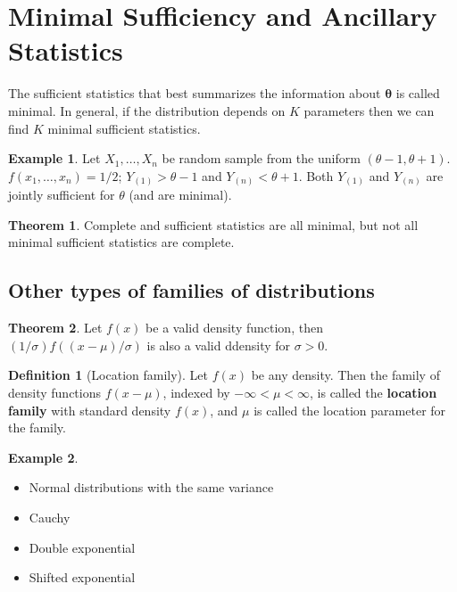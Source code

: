 \documentclass{book}
\theoremstyle{definition}
\newtheorem{defn}{Definition}[section]
\newtheorem{thm}{Theorem}[section]
\newtheorem{exmp}{Example}[section]
\begin{document}
\section{Minimal Sufficiency and Ancillary Statistics}

The sufficient statistics that best summarizes the information about $\bm\theta$ is called minimal. In general, if the distribution depends on $K$ parameters then we can find $K$ minimal sufficient statistics. 


\begin{exmp}
	Let $X_1,\dots, X_n$ be random sample from the uniform $(\theta-1,\theta+1)$. $f(x_1,\dots, x_n)= 1/2$; $Y_{(1)} > \theta - 1$ and $Y_{(n)} < \theta + 1$. Both $Y_{(1)}$ and $Y_{(n)}$ are jointly sufficient for $\theta$ (and are minimal). 	
\end{exmp}



\begin{thm}
	Complete and sufficient statistics are all minimal, but not all minimal sufficient statistics are complete. 
\end{thm}



\subsection{Other types of families of distributions}

\begin{thm}
Let $f(x)$ be a valid density function, then $(1/\sigma)f((x-\mu)/\sigma)$ is also a valid ddensity for $\sigma > 0$. 
\end{thm}

\begin{defn}[Location family]
	Let $f(x)$ be any density. Then the family of density functions $f(x-\mu)$, indexed by $-\infty < \mu < \infty$, is called the \textbf{location family} with standard density $f(x)$, and $\mu$ is called the location parameter for the family. 
\end{defn}


\begin{exmp}
	\begin{itemize}
	\item Normal distributions with the same variance 
	\item Cauchy
	\item Double exponential
	\item Shifted exponential
	\end{itemize}
\end{exmp}
\end{document}
